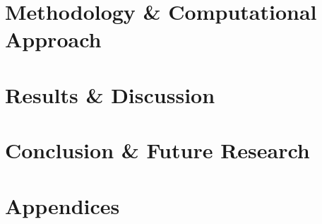 \documentclass[12pt, oneside]{book}
\begin{document}

\part{Methodology \& Computational Approach}




\part{Results \& Discussion}




\part{Conclusion \& Future Research}



\appendix           %
\part*{Appendices}




 


\newpage 
\printbibliography[heading=bibintoc, title={References}]
\end{document}
